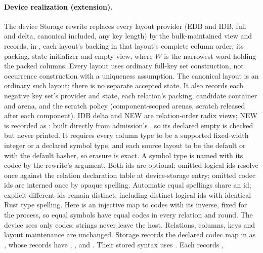 \paragraph{Device realization (extension).}
The device Storage rewrite replaces every layout provider (EDB and IDB, full
and delta, canonical included, any key length) by the bulk-maintained view
 and records,
in , each layout's backing
 in that layout's complete column order,
its packing, state initializer and empty view, where $W$ is the narrowest
word holding the packed columns. Every layout uses ordinary full-key set
construction, not occurrence construction with a uniqueness assumption.
The canonical layout is an ordinary such layout; there is no separate accepted
state. It also records each negative key set's provider and state, each
relation's packing, candidate container and arena, and the scratch policy
(component-scoped arenas, scratch released after each component).
IDB delta and NEW are relation-order radix views; NEW is recorded as
: built directly from admission's , so its declared
empty  is checked but never printed. It requires every column
type to be a supported fixed-width integer or a declared symbol type, and each
source layout to be the default  or  with the
default hasher, so erasure is exact. A symbol type is named with its codec by the rewrite's
 argument. Both ids are optional:
omitted logical ids resolve once against the relation declaration table at
device-storage entry; omitted codec ids are interned once by opaque spelling.
Automatic equal spellings share an id; explicit different ids remain distinct,
including distinct logical ids with identical Rust type spelling.
Here  is an injective map to  codes
with its inverse, fixed for the process, so
equal symbols have equal codes in every relation and round. The device sees only codes; strings never leave the host.
Relations, columns, keys and layout maintenance are unchanged. Storage records
the declared codec map in 
as , whose records have
, ,
 and . Their stored syntax uses
.
Each  records ,
